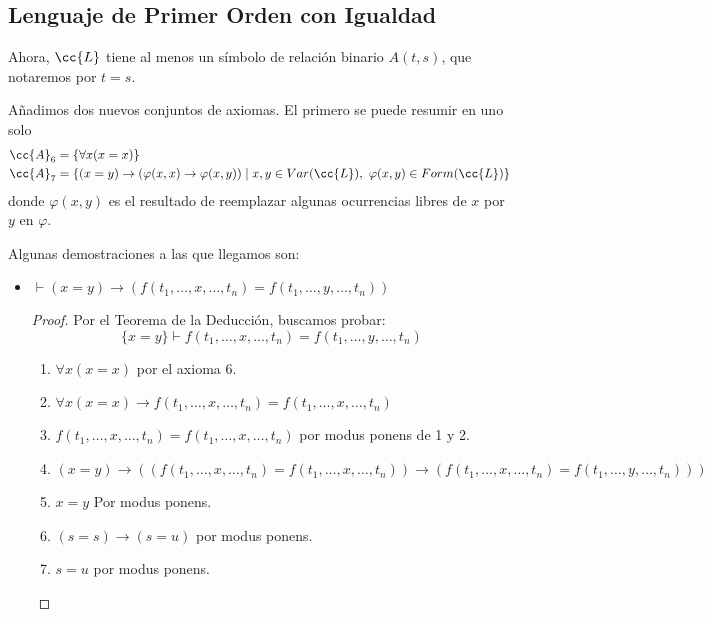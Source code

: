 \subsection{Lenguaje de Primer Orden con Igualdad}
Ahora, $\cc{L}$ tiene al menos un símbolo de relación binario $A(t,s)$, que notaremos por $t=s$.

Añadimos dos nuevos conjuntos de axiomas. El primero se puede resumir en uno solo %
\begin{align*}
    \cc{A}_6 &= \{\forall x(x=x)\}\\
    \cc{A}_7 &= \{(x=y)\to (\varphi(x,x)\to \varphi(x,y))\mid x,y\in Var(\cc{L}),\ \varphi(x,y)\in Form(\cc{L})\}
\end{align*}
donde $\varphi(x,y)$ es el resultado de reemplazar algunas ocurrencias libres de $x$ por $y$ en $\varphi$.

Algunas demostraciones a las que llegamos son:
\begin{itemize}
    \item $\vdash (x=y)\to (f(t_1,\dots,x,\dots,t_n)=f(t_1,\dots,y,\dots,t_n))$
    \begin{proof}
        Por el Teorema de la Deducción, buscamos probar:
        \begin{equation*}
            \{x=y\}\vdash f(t_1,\dots,x,\dots,t_n)=f(t_1,\dots,y,\dots,t_n)
        \end{equation*}
        \begin{enumerate}
            \item $\forall x(x=x)$ por el axioma 6.
            \item $\forall x(x=x)\to f(t_1,\dots,x,\dots,t_n)=f(t_1,\dots,x,\dots,t_n)$
            \item $f(t_1,\dots,x,\dots,t_n)=f(t_1,\dots,x,\dots,t_n)$ por modus ponens de 1 y 2.
            \item $(x=y)\to ((f(t_1,\dots,x,\dots,t_n)=f(t_1,\dots,x,\dots,t_n))\to (f(t_1,\dots,x,\dots,t_n)=f(t_1,\dots,y,\dots,t_n)))$
            \item $x=y$ Por modus ponens.
            \item $(s=s)\to (s=u)$ por modus ponens.
            \item $s=u$ por modus ponens.
        \end{enumerate}
    \end{proof}
\end{itemize}